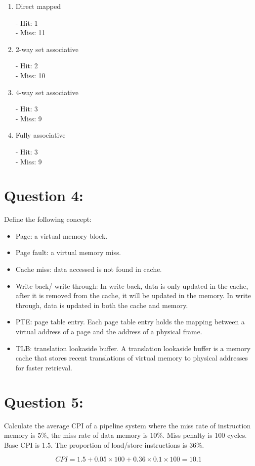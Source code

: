 \documentclass[12pt,a4paper]{article}
\begin{document}
\begin{enumerate}
  \item Direct mapped

        - Hit: 1\\
        - Miss: 11

  \item 2-way set associative

        - Hit: 2\\
        - Miss: 10

  \item 4-way set associative

        - Hit: 3\\
        - Miss: 9

  \item Fully associative

        - Hit: 3\\
        - Miss: 9

\end{enumerate}

\section*{Question 4:}

Define the following concept:

\begin{itemize}

  \item Page: a virtual memory block.
  \item Page fault: a virtual memory miss.
  \item Cache miss: data accessed is not found in cache.
  \item Write back/ write through: In write back, data is only updated in the cache, after it is removed from the cache, it will be updated in the memory. In write through, data is updated in both the cache and memory.
  \item PTE: page table entry. Each page table entry holds the mapping between a virtual address of a page and the address of a physical frame.
  \item TLB: translation lookaside buffer. A translation lookaside buffer is a memory cache that stores recent translations of virtual memory to physical addresses for faster retrieval.

\end{itemize}

\section*{Question 5:}
Calculate the average CPI of a pipeline system where the miss rate of instruction memory is $5\%$, the miss rate of data memory is $10\%$. Miss penalty is 100 cycles. Base CPI is 1.5. The proportion of load/store instructions is $36\%$.


$$CPI = 1.5 + 0.05 \times 100 + 0.36 \times 0.1 \times 100 = 10.1 $$\\
\end{document}
